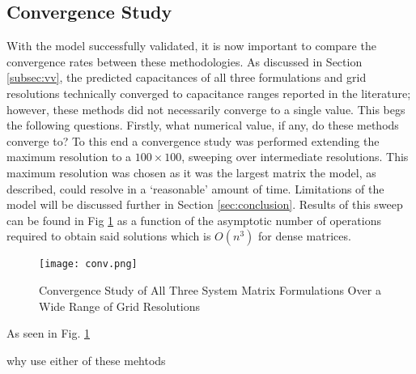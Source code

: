 \subsection{Convergence Study}
\label{subsec:cs}
With the model successfully validated, it is now important to compare the convergence rates between these methodologies. As discussed in Section \ref{subsec:vv}, the predicted capacitances of all three formulations and grid resolutions technically converged to capacitance ranges reported in the literature; however, these methods did not necessarily converge to a single value. This begs the following questions. Firstly, what numerical value, if any, do these methods converge to? To this end a convergence study was performed extending the maximum resolution to a $100\times 100$, sweeping over intermediate resolutions. This maximum resolution was chosen as it was the largest matrix the model, as described, could resolve in a `reasonable' amount of time. Limitations of the model will be discussed further in Section \ref{sec:conclusion}. Results of this sweep can be found in Fig \ref{fig:convergence} as a function of the asymptotic number of operations required to obtain said solutions which is $O(n^3)$ for dense matrices. 

\begin{figure}[h!]  
	\centering
	\texttt{[image: conv.png]} 
	\caption{Convergence Study of All Three System Matrix Formulations Over a Wide Range of Grid Resolutions}
	\label{fig:convergence}
\end{figure}

As seen in Fig. \ref{fig:convergence}

why use either of these mehtods